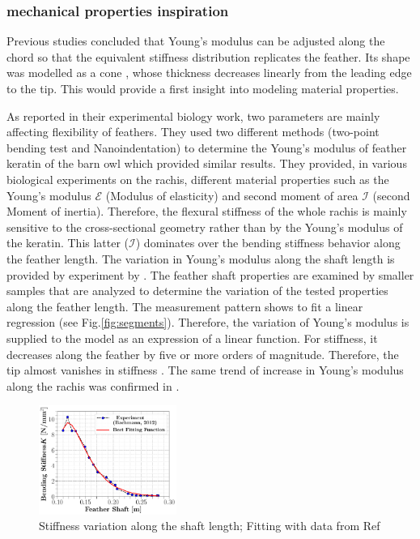 \documentclass[conf]{new-aiaa}
\begin{document}
\subsubsection{mechanical properties inspiration}
Previous studies concluded that Young's modulus can be adjusted along the chord so that the equivalent stiffness distribution replicates the feather. Its shape was modelled as a cone \cite{Lingham-Soliar2017MicrostructuralFeathers}, whose thickness decreases linearly from the leading edge to the tip. This would provide a first insight into modeling material properties.



As \citet{Bachmann2012} reported in their experimental biology work, two parameters are mainly affecting flexibility of feathers.
%
They used two different methods (two-point bending test and Nanoindentation) to determine the Young's modulus of feather keratin of the barn owl which provided similar results.
%
They provided, in various biological experiments on the rachis, different material properties such as the Young's modulus $\mathcal{E}$ (Modulus of elasticity) and second moment of area $\mathcal{I}$ (second Moment of inertia).
%
Therefore, the flexural stiffness of the whole rachis is mainly sensitive to the cross-sectional geometry rather than by the Young's modulus of the keratin.
%
This latter ($\mathcal{I}$) dominates over the bending stiffness behavior along the feather length.
%
The variation in Young’s modulus along the shaft length is provided by experiment by \citet{Bonser1995TheKeratin}.
%
The feather shaft properties are examined by smaller samples that are analyzed to determine the variation of the tested properties along the feather length.
%
The measurement pattern shows to fit a linear regression (see Fig.\ref{fig:segments}).
%
Therefore, the variation of Young's modulus is supplied to the model as an expression of a linear function.
%
For stiffness, it decreases along the feather by five or more orders of magnitude.
%
Therefore, the tip almost vanishes in stiffness \cite{Bostandzhiyan2008FlexuralShaft}.
%
The same trend of increase in Young's modulus along the rachis was confirmed in \cite{Cameron2003YoungsFeathers}.


\begin{figure}[ht!]
\centering
\includegraphics[width=0.4\textwidth]{figs/Bending-distribution.pdf}
\caption{Stiffness variation along the shaft length; Fitting with data from Ref \cite{Bachmann2012FlexuralProperties}}
\label{fig:stiffness}
\end{figure}
\end{document}
